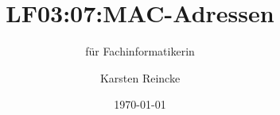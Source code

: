 \documentclass[]{beamer}
\title{LF03:07:MAC-Adressen}
\subtitle{für Fachinformatikerin}
\institute[GS-LDK]{Gewerbliche Schulen Dillenburg}
\author{Karsten Reincke}
\date{\today}
\def\cfgGl{../../../cfg.gl/}
\begin{document}

\begin{frame}
  \titlepage

  
\end{frame}






\logo{}
\newpage



%
\end{document}
